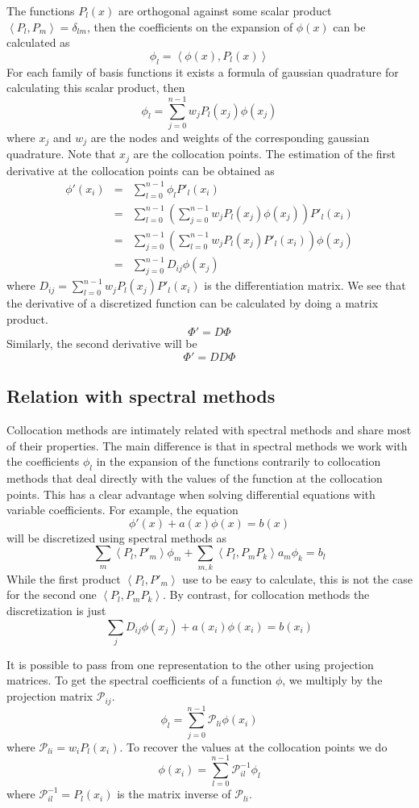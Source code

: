 The functions $P_l(x)$ are orthogonal against some scalar product $\left<P_l,P_m\right>=\delta_{lm}$,
then the coefficients on the expansion of $\phi(x)$ can be calculated as
$$\phi_l=\left<\phi(x),P_l(x)\right>$$
For each family of basis functions it exists a formula of gaussian quadrature for calculating this
scalar product, then
$$\phi_l=\sum_{j=0}^{n-1}w_jP_l(x_j)\phi(x_j)$$
where $x_j$ and $w_j$ are the nodes and weights of the corresponding gaussian quadrature. Note
that $x_j$ are the collocation points. The estimation of the first derivative at the collocation 
points can be obtained as
$$\begin{array}{rcl}
\phi'(x_i)&=&\displaystyle\sum_{l=0}^{n-1}\phi_lP'_l(x_i)\\
&=&\displaystyle\sum_{l=0}^{n-1}\left(\sum_{j=0}^{n-1}w_jP_l(x_j)\phi(x_j)\right)P'_l(x_i)\\
&=&\displaystyle\sum_{j=0}^{n-1}\left(\sum_{l=0}^{n-1}w_jP_l(x_j)P'_l(x_i)\right)\phi(x_j)\\
&=&\displaystyle\sum_{j=0}^{n-1}D_{ij}\phi(x_j)
\end{array}$$
where $D_{ij}=\displaystyle\sum_{l=0}^{n-1}w_jP_l(x_j)P'_l(x_i)$ is the differentiation matrix.
We see that the derivative of a discretized function can be calculated
by doing a matrix product.
$$\Phi'=D\Phi$$
Similarly, the second derivative will be 
$$\Phi'=DD\Phi$$

\subsection{Relation with spectral methods}

Collocation methods are intimately related with spectral methods and share most of their properties.
The main difference is that in spectral methods we work with the coefficients $\phi_l$ in 
the expansion of the functions contrarily to collocation methods that deal directly with the values
of the function at the collocation points. This has a clear advantage when solving differential
equations with variable coefficients. For example, the equation
$$\phi'(x)+a(x)\phi(x)=b(x)$$
will be discretized using spectral methods as
$$\sum_m\left<P_l,P'_m\right>\phi_m+\sum_{m,k}\left<P_l,P_mP_k\right>a_m\phi_k=b_l$$
While the first product $\left<P_l,P'_m\right>$ use to be easy to calculate, this is not the case
for the second one $\left<P_l,P_mP_k\right>$. By contrast, for collocation methods the discretization
is just
$$\sum_jD_{ij}\phi(x_j)+a(x_i)\phi(x_i)=b(x_i)$$

It is possible to pass from one representation to the other using projection matrices. 
To get the spectral coefficients of a function $\phi$, we multiply by the projection matrix $\mathcal{P}_{ij}$.
$$\phi_l=\sum_{j=0}^{n-1}\mathcal{P}_{li}\phi(x_i)$$
where $\mathcal{P}_{li}=w_iP_l(x_i)$. To recover the values at the collocation points we do
$$\phi(x_i)=\sum_{l=0}^{n-1}\mathcal{P}^{-1}_{il}\phi_l$$
where $\mathcal{P}^{-1}_{il}=P_l(x_i)$ is the matrix inverse of $\mathcal{P}_{li}$.

